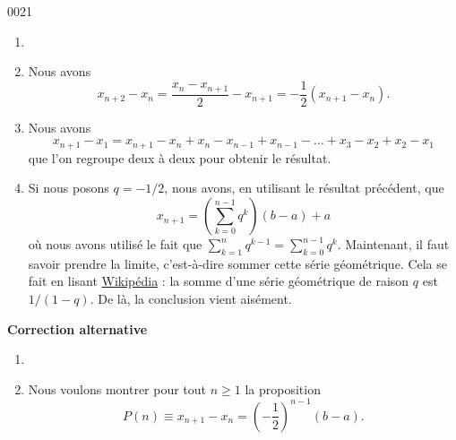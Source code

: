 
\begin{corrige}{0021}

\begin{enumerate}
\item {}
\item Nous avons
\begin{equation}
	x_{n+2}-x_n=\frac{ x_n-x_{n+1} }{ 2 }-x_{n+1}=-\frac{1}{ 2 }(x_{n+1}-x_n).
\end{equation}

\item 
Nous avons
\begin{equation}
	x_{n+1}-x_1=x_{n+1}-x_n+x_n-x_{n-1}+x_{n-1}-\ldots +x_3-x_2+x_2-x_1
\end{equation}
que l'on regroupe deux à deux pour obtenir le résultat.

\item
Si nous posons $q=-1/2$, nous avons, en utilisant le résultat précédent, que
\begin{equation}
	x_{n+1}=\left( \sum_{k=0}^{n-1}q^k \right)(b-a)+a
\end{equation}
où nous avons utilisé le fait que $\sum_{k=1}^nq^{k-1}=\sum_{k=0}^{n-1}q^k$. Maintenant, il faut savoir prendre la limite, c'est-à-dire sommer cette série géométrique. Cela se fait en lisant \href{http://fr.wikipedia.org/wiki/Série_géométrique}{Wikipédia} : la somme d'une série géométrique de raison $q$ est $1/(1-q)$. De là, la conclusion vient aisément.

\end{enumerate}

{\bf Correction alternative}

\begin{enumerate}
\item {}

\item
 Nous voulons montrer pour tout $n \geq 1$ la proposition
  \begin{equation*}
    P(n) \equiv x_{n+1} - x_n = {\left(-\frac12\right)}^{n-1} (b-a).
  \end{equation*}


\end{enumerate}
\end{corrige}
